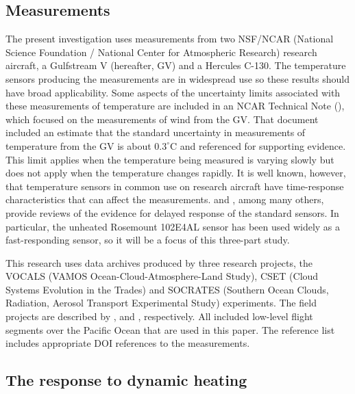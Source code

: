 \documentclass[11pt,twoside,american,12pt,twoside,american]{article}\usepackage[]{graphicx}\usepackage[]{color}
\begin{document}
\subsection{Measurements}

The present investigation uses measurements from two NSF/NCAR (National
Science Foundation / National Center for Atmospheric Research) research
aircraft, a Gulfstream V (hereafter, GV) and a Hercules C-130. The
temperature sensors producing the measurements are in widespread use
so these results should have broad applicability. Some aspects of
the uncertainty limits associated with these measurements of temperature
are included in an NCAR Technical Note (\citet{Cooper2016ncartn}),
which focused on the measurements of wind from the GV\@. That document
included an estimate that the standard uncertainty in measurements
of temperature from the GV is about $0.3^{\circ}\mathrm{C}$ and referenced
\citet{CooperEtAl2014} for supporting evidence. This limit applies
when the temperature being measured is varying slowly but does not
apply when the temperature changes rapidly. It is well known, however,
that temperature sensors in common use on research aircraft have time-response
characteristics that can affect the measurements. \citet{FrieheKhelif1992}
and \citet{LawsonRodi1992}, among many others, provide reviews of
the evidence for delayed response of the standard sensors. In particular,
the unheated Rosemount 102E4AL sensor has been used widely as a fast-responding
sensor, so it will be a focus of this three-part study.

This research uses data archives produced by three research projects,
the VOCALS (VAMOS Ocean-Cloud-Atmosphere-Land Study), CSET (Cloud
Systems Evolution in the Trades) and SOCRATES (Southern Ocean Clouds,
Radiation, Aerosol Transport Experimental Study) experiments. The
field projects are described by \citet{wood2011vamos}, \citet{albrecht2019cloud}
and \citet{mcfarquhar2014southern}, respectively. All included low-level
flight segments over the Pacific Ocean that are used in this paper.
The reference list includes appropriate DOI references to the measurements.

\subsection{The response to dynamic heating}
\end{document}
